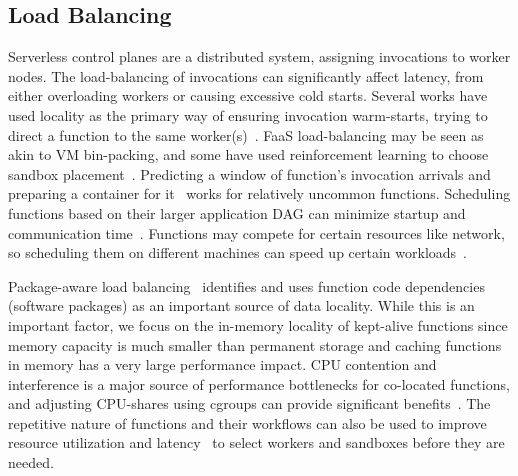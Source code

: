 
\subsection{Load Balancing}

Serverless control planes are a distributed system, assigning invocations to worker nodes.
The load-balancing of invocations can significantly affect latency, from either overloading workers or causing excessive cold starts. 
Several works have used locality as the primary way of ensuring invocation warm-starts, trying to direct a function to the same worker(s)~\cite{package-cristina-19, leegreedy}.
FaaS load-balancing may be seen as akin to VM bin-packing, and some have used reinforcement learning to choose sandbox placement~\cite{balaji2021fireplace}.
Predicting a window of function's invocation arrivals and preparing a container for it~\cite{shahrad2020serverless} works for relatively uncommon functions.
Scheduling functions based on their larger application DAG can minimize startup and communication time~\cite{shen2021defuse, abdi2023palette, guo_decomposing_2022, kotni2021faastlane, shen_defuse_2021,mahgoub_wisefuse_2022,zhou_qos-aware_2022}.
Functions may compete for certain resources like network, so scheduling them on different machines can speed up certain workloads~\cite{tian_owl_2022}.

Package-aware load balancing~\cite{package-cristina-19}  identifies and uses function code dependencies (software packages) as an important source of data locality.
While this is an important factor, we focus on the in-memory locality of kept-alive functions since memory capacity is much smaller than permanent storage and caching functions in memory has a very large performance impact.
CPU contention and interference is a major source of performance bottlenecks for co-located functions, and adjusting CPU-shares using cgroups can provide significant benefits~\cite{suresh2019fnsched, suresh2021servermore, ensure-faas-acsos20}.
The repetitive nature of functions and their workflows can also be used to improve resource utilization and latency~\cite{hunhoff2020proactive, yu2021faasrank, puru_xanadu_20, przybylski2021data} to select workers and sandboxes before they are needed. %


